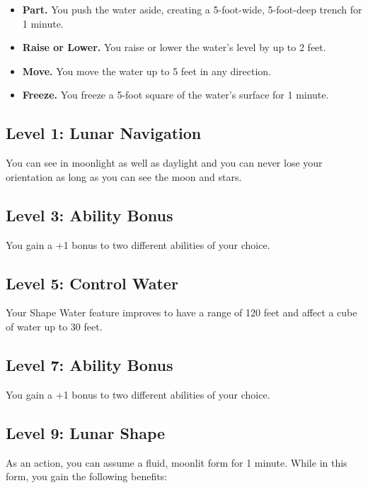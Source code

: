 \documentclass[12pt,letterpaper,twocolumn,openany,nodeprecatedcode,bg=none]{dndbook}
\providecommand{\tightlist}{%
  \setlength{\itemsep}{0pt}\setlength{\parskip}{0pt}}
\let\oldsubsection\subsection
\renewcommand{\subsection}[1]{%
  \needspace{5\baselineskip}%
  \oldsubsection{#1}%
}
\begin{document}
\begin{itemize}
\tightlist
\item
  \textbf{Part.} You push the water aside, creating a 5-foot-wide,
  5-foot-deep trench for 1 minute.
\item
  \textbf{Raise or Lower.} You raise or lower the water's level by up to
  2 feet.
\item
  \textbf{Move.} You move the water up to 5 feet in any direction.
\item
  \textbf{Freeze.} You freeze a 5-foot square of the water's surface for
  1 minute.
\end{itemize}

\subsection{Level 1: Lunar Navigation}\label{level-1-lunar-navigation}

You can see in moonlight as well as daylight and you can never lose your
orientation as long as you can see the moon and stars.

\subsection{Level 3: Ability Bonus}\label{level-3-ability-bonus}

You gain a +1 bonus to two different abilities of your choice.

\subsection{Level 5: Control Water}\label{level-5-control-water}

Your Shape Water feature improves to have a range of 120 feet and affect
a cube of water up to 30 feet.

\subsection{Level 7: Ability Bonus}\label{level-7-ability-bonus}

You gain a +1 bonus to two different abilities of your choice.

\subsection{Level 9: Lunar Shape}\label{level-9-lunar-shape}

As an action, you can assume a fluid, moonlit form for 1 minute. While
in this form, you gain the following benefits:
\end{document}
